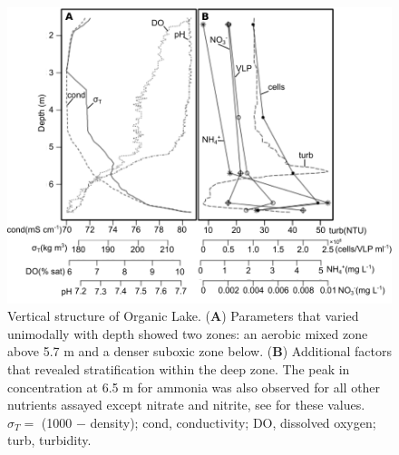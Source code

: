 \begin{figure}
\includegraphics[width=\textwidth]{orglake_figures/vert_struc.pdf}
\caption[Vertical structure of Organic Lake]{Vertical structure of Organic Lake. (\textbf{A}) Parameters that varied unimodally with depth showed two zones: an aerobic mixed zone above 5.7 m and a denser suboxic zone below. (\textbf{B}) Additional factors that revealed stratification within the deep zone. The peak in concentration at 6.5 m for ammonia was also observed for all other nutrients assayed except nitrate and nitrite, see  for these values. $\sigma_{T} =$ (1000 $-$ density); cond, conductivity; \textsc{DO}, dissolved oxygen; turb, turbidity.}
\label{fig:vert_struc}

\end{figure}
